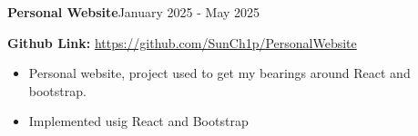 \documentclass[11pt]{article}
\newcommand{\project}[4]{
    \noindent \textbf{#1}\normalsize \hfill #2
    \par
    \noindent #3
    #4
}
\begin{document}
\begin{spacing}{1}
{\begin{itemize}
            \end{itemize}
            \par
        }
        \project{Personal Website}{January 2025 - May 2025}{\textbf{Github Link:} \url{https://github.com/SunCh1p/PersonalWebsite}}
        {
            \begin{itemize}
                \setlength\itemsep{0.01em}
                \item Personal website, project used to get my bearings around React and bootstrap.
                \item Implemented usig React and Bootstrap\par
            \end{itemize}
            \par
        }
    \end{spacing}
\end{document}
